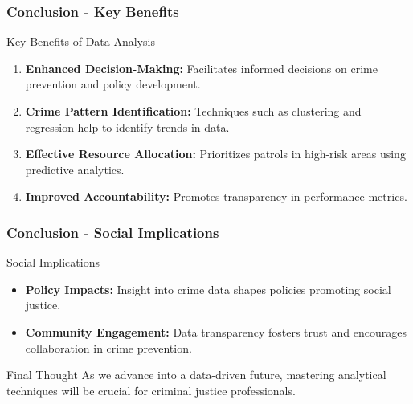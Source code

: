 \documentclass[aspectratio=169]{beamer}
\begin{document}
\begin{frame}[fragile]
  \frametitle{Conclusion - Key Benefits}
  \begin{block}{Key Benefits of Data Analysis}
    \begin{enumerate}
      \item \textbf{Enhanced Decision-Making:} Facilitates informed decisions on crime prevention and policy development.
      \item \textbf{Crime Pattern Identification:} Techniques such as clustering and regression help to identify trends in data.
      \item \textbf{Effective Resource Allocation:} Prioritizes patrols in high-risk areas using predictive analytics.
      \item \textbf{Improved Accountability:} Promotes transparency in performance metrics.
    \end{enumerate}
  \end{block}
\end{frame}

\begin{frame}[fragile]
  \frametitle{Conclusion - Social Implications}
  \begin{block}{Social Implications}
    \begin{itemize}
      \item \textbf{Policy Impacts:} Insight into crime data shapes policies promoting social justice.
      \item \textbf{Community Engagement:} Data transparency fosters trust and encourages collaboration in crime prevention.
    \end{itemize}
  \end{block}
  \begin{block}{Final Thought}
    As we advance into a data-driven future, mastering analytical techniques will be crucial for criminal justice professionals.
  \end{block}
\end{frame}
\end{document}
